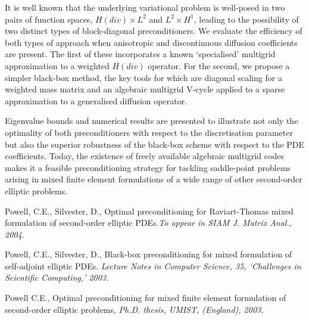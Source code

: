 \documentclass{report}
\begin{document}
It is well known that the underlying variational problem is well-posed in
two pairs of function spaces, $H(div)\times L^{2}$ and $L^{2} \times
H^{1}$, leading to the possibility of two distinct types of
block-diagonal preconditioners. We evaluate the efficiency of both types
of approach when anisotropic and discontinuous diffusion coefficients are
present. The
first of these incorporates a known `specialised' multigrid approximation
to a weighted $H(div)$ operator. For the second, we propose a simpler
black-box method, the key tools for which are diagonal scaling for a
weighted mass matrix and an algebraic multigrid V-cycle applied to a
sparse approximation to a generalised diffusion operator.

Eigenvalue bounds and numerical results are presented to illustrate not
only the optimality of both preconditioners with respect to the
discretisation parameter but also the superior robustness of the
black-box scheme with respect to the PDE coefficients. Today, the
existence of freely available algebraic multigrid codes makes it a
feasible preconditioning strategy for tackling saddle-point problems
arising in mixed finite element formulations of a wide range of other
second-order elliptic problems.

\begin{thebibliography}{10}
 Powell, C.E., Silvester, D., Optimal preconditioning for
Raviart-Thomas mixed formulation of second-order elliptic PDEs.\textit{To
appear in SIAM J. Matrix Anal., 2004.}

Powell, C.E., Silvester, D., Black-box preconditioning for
mixed formulation of self-adjoint elliptic PDEs. \textit{Lecture Notes in
Computer Science, 35, `Challenges in Scientific Computing,' 2003.}

Powell C.E., Optimal preconditioning for mixed finite element
formulation of second-order elliptic problems, \textit{Ph.D. thesis,
UMIST, (England), 2003.}
\end{thebibliography}
\end{document}
